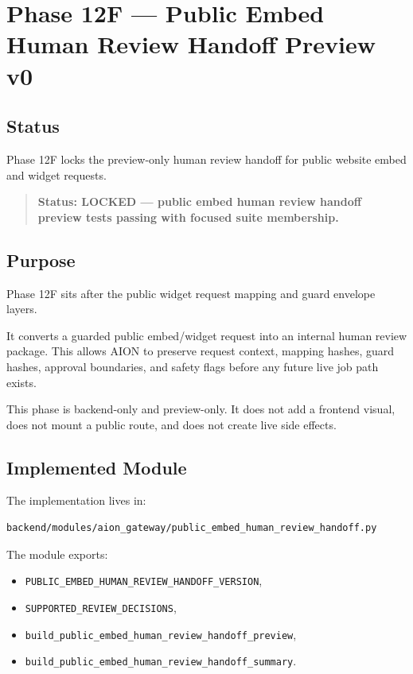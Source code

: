 \section{Phase 12F --- Public Embed Human Review Handoff Preview v0}
\label{sec:aion-public-embed-human-review-handoff-v0}

\subsection{Status}

Phase 12F locks the preview-only human review handoff for public website embed and widget requests.

\begin{quote}
\textbf{Status: LOCKED --- public embed human review handoff preview tests passing with focused suite membership.}
\end{quote}

\subsection{Purpose}

Phase 12F sits after the public widget request mapping and guard envelope layers.

It converts a guarded public embed/widget request into an internal human review package. This allows AION to preserve request context, mapping hashes, guard hashes, approval boundaries, and safety flags before any future live job path exists.

This phase is backend-only and preview-only. It does not add a frontend visual, does not mount a public route, and does not create live side effects.

\subsection{Implemented Module}

The implementation lives in:

\begin{verbatim}
backend/modules/aion_gateway/public_embed_human_review_handoff.py
\end{verbatim}

The module exports:

\begin{itemize}
  \item \texttt{PUBLIC\_EMBED\_HUMAN\_REVIEW\_HANDOFF\_VERSION},
  \item \texttt{SUPPORTED\_REVIEW\_DECISIONS},
  \item \texttt{build\_public\_embed\_human\_review\_handoff\_preview},
  \item \texttt{build\_public\_embed\_human\_review\_handoff\_summary}.
\end{itemize}

